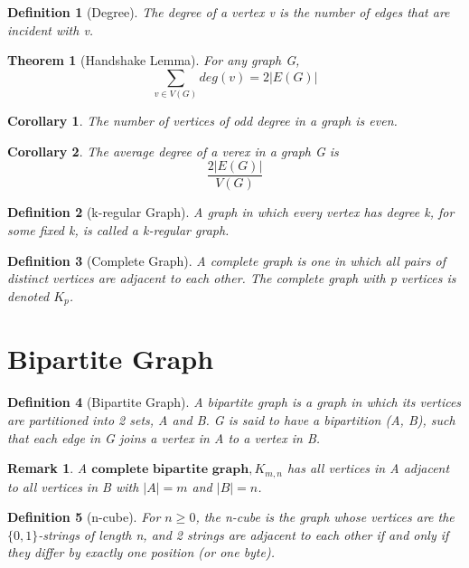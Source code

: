 \documentclass[11pt, oneside]{book}
\theoremstyle{break}
\newtheorem{thm}{Theorem}[section]
\newtheorem{crly}{Corollary}[thm]
\newtheorem{defn}{Definition}[section]
\newtheorem*{remark}{Remark}
\begin{document}
\begin{defn}[Degree]
	The degree of a vertex v is the number of edges that are incident with v.
\end{defn}

\begin{thm}[Handshake Lemma]
	For any graph G,
	\[
		\sum_{v \in V(G)} deg(v) = 2 | E(G) |
	\]
\end{thm}

\begin{crly}
	The number of vertices of odd degree in a graph is even.
\end{crly}

\begin{crly}
	The average degree of a verex in a graph G is
	\[
		\frac{2| E(G) |}{V(G)}
	\]
\end{crly}

\begin{defn}[k-regular Graph]
	A graph in which every vertex has degree k, for some fixed k, is called a k-regular graph.
\end{defn}

\begin{defn}[Complete Graph]
	A complete graph is one in which all pairs of distinct vertices are adjacent to each other. The complete graph with p vertices is denoted $K_p$.
\end{defn}


\section{Bipartite Graph}

\begin{defn}[Bipartite Graph]
	A bipartite graph is a graph in which its vertices are partitioned into 2 sets, A and B. G is said to have a bipartition (A, B), such that each edge in G joins a vertex in A to a vertex in B.
\end{defn}

\begin{remark}
	A $\textbf{complete bipartite graph}, K_{m, n}$ has all vertices in A adjacent to all vertices in B with $|A| = m$ and $|B| = n$. 
\end{remark}

\begin{defn}[n-cube]
	For $n \geq 0$, the n-cube is the graph whose vertices are the $\{0, 1\}$-strings of length n, and 2 strings are adjacent to each other if and only if they differ by exactly one position (or one byte).
\end{defn}
\end{document}
